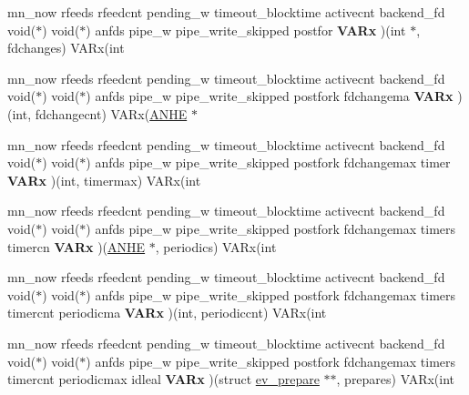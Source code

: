 \begin{DoxyCompactItemize}
mn\+\_\+now rfeeds rfeedcnt pending\+\_\+w timeout\+\_\+blocktime activecnt backend\+\_\+fd void($\ast$) void($\ast$) anfds pipe\+\_\+w pipe\+\_\+write\+\_\+skipped postfor {\bfseries V\+A\+Rx} )(int $\ast$, fdchanges) V\+A\+Rx(int
\item 
\hypertarget{structev__loop_a0fa9e47acaf81489e0dd8bc5b90dd254}{}\label{structev__loop_a0fa9e47acaf81489e0dd8bc5b90dd254} 
mn\+\_\+now rfeeds rfeedcnt pending\+\_\+w timeout\+\_\+blocktime activecnt backend\+\_\+fd void($\ast$) void($\ast$) anfds pipe\+\_\+w pipe\+\_\+write\+\_\+skipped postfork fdchangema {\bfseries V\+A\+Rx} )(int, fdchangecnt) V\+A\+Rx(\hyperlink{struct_a_n_h_e}{A\+N\+HE} $\ast$
\item 
\hypertarget{structev__loop_a6f56555476bcf149cbdcffb172f48319}{}\label{structev__loop_a6f56555476bcf149cbdcffb172f48319} 
mn\+\_\+now rfeeds rfeedcnt pending\+\_\+w timeout\+\_\+blocktime activecnt backend\+\_\+fd void($\ast$) void($\ast$) anfds pipe\+\_\+w pipe\+\_\+write\+\_\+skipped postfork fdchangemax timer {\bfseries V\+A\+Rx} )(int, timermax) V\+A\+Rx(int
\item 
\hypertarget{structev__loop_a4743a441179a66c19db719bcb9726abd}{}\label{structev__loop_a4743a441179a66c19db719bcb9726abd} 
mn\+\_\+now rfeeds rfeedcnt pending\+\_\+w timeout\+\_\+blocktime activecnt backend\+\_\+fd void($\ast$) void($\ast$) anfds pipe\+\_\+w pipe\+\_\+write\+\_\+skipped postfork fdchangemax timers timercn {\bfseries V\+A\+Rx} )(\hyperlink{struct_a_n_h_e}{A\+N\+HE} $\ast$, periodics) V\+A\+Rx(int
\item 
\hypertarget{structev__loop_ae7f845d72a332dc09fc58bc9bff84c5f}{}\label{structev__loop_ae7f845d72a332dc09fc58bc9bff84c5f} 
mn\+\_\+now rfeeds rfeedcnt pending\+\_\+w timeout\+\_\+blocktime activecnt backend\+\_\+fd void($\ast$) void($\ast$) anfds pipe\+\_\+w pipe\+\_\+write\+\_\+skipped postfork fdchangemax timers timercnt periodicma {\bfseries V\+A\+Rx} )(int, periodiccnt) V\+A\+Rx(int
\item 
\hypertarget{structev__loop_a5943a455162c6f045b8653971c6b2ada}{}\label{structev__loop_a5943a455162c6f045b8653971c6b2ada} 
mn\+\_\+now rfeeds rfeedcnt pending\+\_\+w timeout\+\_\+blocktime activecnt backend\+\_\+fd void($\ast$) void($\ast$) anfds pipe\+\_\+w pipe\+\_\+write\+\_\+skipped postfork fdchangemax timers timercnt periodicmax idleal {\bfseries V\+A\+Rx} )(struct \hyperlink{structev__prepare}{ev\+\_\+prepare} $\ast$$\ast$, prepares) V\+A\+Rx(int
\item 
\hypertarget{structev__loop_adf89c4ecb8abadec6860df9077bc1b93}{}\label{structev__loop_adf89c4ecb8abadec6860df9077bc1b93} 
$$
\end{DoxyCompactItemize}
